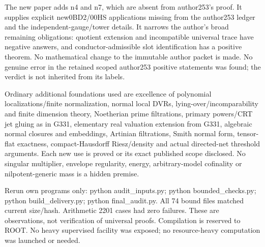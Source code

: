 \documentclass[11pt]{article}
\begin{document}
\begin{GrantData}
The new paper adds n4 and n7, which are absent from author253's proof. It supplies explicit new0BD2/00HS applications missing from the author253 ledger and the independent-gauge/tower details. It narrows the author's broad remaining obligations: quotient extension and incompatible universal trace have negative answers, and conductor-admissible slot identification has a positive theorem. No mathematical change to the immutable author packet is made. No genuine error in the retained scoped author253 positive statements was found; the verdict is not inherited from its labels.

Ordinary additional foundations used are excellence of polynomial localizations/finite normalization, normal local DVRs, lying-over/incomparability and finite dimension theory, Noetherian prime filtrations, primary powers/CRT jet gluing as in G331, elementary real valuation extension from G331, algebraic normal closures and embeddings, Artinian filtrations, Smith normal form, tensor-flat exactness, compact-Hausdorff Riesz/density and actual directed-net threshold arguments. Each new use is proved or its exact published scope disclosed. No singular multiplier, envelope regularity, energy, arbitrary-model cofinality or nilpotent-generic mass is a hidden premise.

Rerun own programs only: python audit_inputs.py; python bounded_checks.py; python build_delivery.py; python final_audit.py. All 74 bound files matched current size/hash. Arithmetic 2201 cases had zero failures. These are observations, not verification of universal proofs. Compilation is reserved to ROOT. No heavy supervised facility was exposed; no resource-heavy computation was launched or needed.

\end{GrantData}
\end{document}
